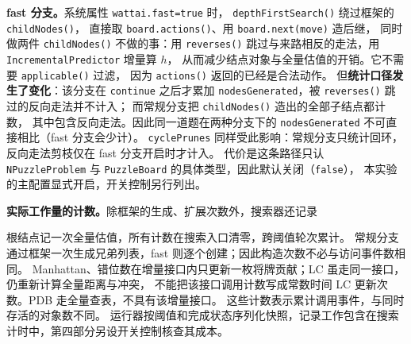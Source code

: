 \textbf{fast 分支。}系统属性 \texttt{wattai.fast=true} 时，
\texttt{depthFirstSearch()} 绕过框架的 \texttt{childNodes()}，
直接取 \texttt{board.actions()}、用 \texttt{board.next(move)} 造后继，
同时做两件 \texttt{childNodes()} 不做的事：用 \texttt{reverses()}
跳过与来路相反的走法，用 \texttt{IncrementalPredictor} 增量算 $h$，
从而减少结点对象与全量估值的开销。它不需要 \texttt{applicable()} 过滤，
因为 \texttt{actions()} 返回的已经是合法动作。
但\textbf{统计口径发生了变化}：该分支在 \texttt{continue} 之后才累加
\texttt{nodesGenerated}，被 \texttt{reverses()} 跳过的反向走法并不计入；
而常规分支把 \texttt{childNodes()} 造出的全部子结点都计数，
其中包含反向走法。因此同一道题在两种分支下的
\texttt{nodesGenerated} 不可直接相比（fast 分支会少计）。
\texttt{cyclePrunes} 同样受此影响：常规分支只统计回环，
反向走法剪枝仅在 fast 分支开启时才计入。
代价是这条路径只认 \texttt{NPuzzleProblem} 与 \texttt{PuzzleBoard}
的具体类型，因此默认关闭（\texttt{false}），
本实验的主配置显式开启，开关控制另行列出。


\textbf{实际工作量的计数。}除框架的生成、扩展次数外，搜索器还记录
\par{}\par
根结点记一次全量估值，所有计数在搜索入口清零，跨阈值轮次累计。
常规分支通过框架一次生成兄弟列表，fast 则逐个创建；因此构造次数不必与访问事件数相同。
Manhattan、错位数在增量接口内只更新一枚将牌贡献；LC 虽走同一接口，仍重新计算全量距离与冲突，
不能把该接口调用计数写成常数时间 LC 更新次数。PDB 走全量查表，不具有该增量接口。
这些计数表示累计调用事件，与同时存活的对象数不同。
运行器按阈值和完成状态序列化快照，记录工作包含在搜索计时中，第四部分另设开关控制核查其成本。

